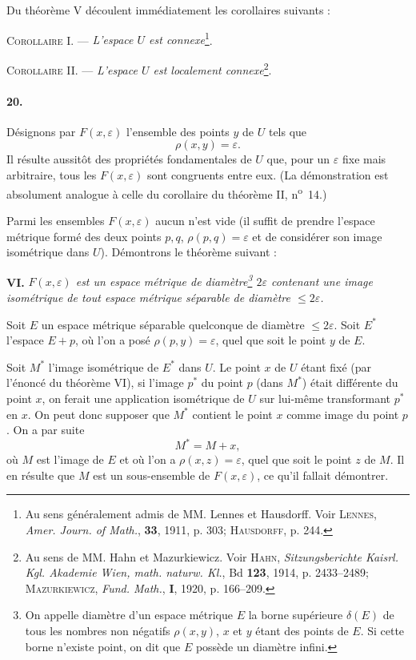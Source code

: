 \documentclass[a4paper,12pt]{amsart}
\newcommand{\srcpage}[1]{} %
\begin{document}
Du théorème V découlent immédiatement les corollaires suivants :

\textsc{Corollaire I.} --- \textit{L'espace $U$ est connexe}\footnote{Au sens généralement admis de MM. Lennes et Hausdorff. Voir \textsc{Lennes}, \textit{Amer. Journ. of Math.}, \textbf{33}, 1911, p. 303; \textsc{Hausdorff}, p. 244.}.

\textsc{Corollaire II.} --- \textit{L'espace $U$ est localement connexe}\footnote{Au sens de MM. Hahn et Mazurkiewicz. Voir \textsc{Hahn}, \textit{Sitzungsberichte Kaisrl. Kgl. Akademie Wien, math. naturw. Kl.}, Bd \textbf{123}, 1914, p. 2433--2489; \textsc{Mazurkiewicz}, \textit{Fund. Math.}, \textbf{I}, 1920, p. 166--209.}.

\srcpage{83}
\paragraph{20.}
Désignons par $F(x,\varepsilon)$ l'ensemble des points $y$ de $U$ tels que
\[\rho(x,y)=\varepsilon.\]
Il résulte aussitôt des propriétés fondamentales de $U$ que, pour un $\varepsilon$ fixe mais arbitraire, tous les $F(x,\varepsilon)$ sont congruents entre eux. (La démonstration est absolument analogue à celle du corollaire du théorème II, n\textsuperscript{o}~14.)

Parmi les ensembles $F(x,\varepsilon)$ aucun n'est vide (il suffit de prendre l'espace métrique formé des deux points $p,q$, $\rho(p,q)=\varepsilon$ et de considérer son image isométrique dans $U$). Démontrons le théorème suivant :

\textbf{VI.} \textit{$F(x,\varepsilon)$ est un espace métrique de diamètre\footnote{On appelle diamètre d'un espace métrique $E$ la borne supérieure $\delta(E)$ de tous les nombres non négatifs $\rho(x,y)$, $x$ et $y$ étant des points de $E$. Si cette borne n'existe point, on dit que $E$ possède un diamètre infini.} $2\varepsilon$ contenant une image isométrique de tout espace métrique séparable de diamètre $\le2\varepsilon$.}

Soit $E$ un espace métrique séparable quelconque de diamètre $\le2\varepsilon$. Soit $E^*$ l'espace $E+p$, où l'on a posé $\rho(p,y)=\varepsilon$, quel que soit le point $y$ de $E$.

Soit $M^*$ l'image isométrique de $E^*$ dans $U$. Le point $x$ de $U$ étant fixé (par l'énoncé du théorème VI), si l'image $p^*$ du point $p$ (dans $M^*$) était différente du point $x$, on ferait une application isométrique de $U$ sur lui-même transformant $p^*$ en $x$. On peut donc supposer que $M^*$ contient le point $x$ comme image du point $p$. On a par suite
\[M^*=M+x,\]
où $M$ est l'image de $E$ et où l'on a $\rho(x,z)=\varepsilon$, quel que soit le point $z$ de $M$. Il en résulte que $M$ est un sous-ensemble de $F(x,\varepsilon)$, ce qu'il fallait démontrer.
\end{document}
